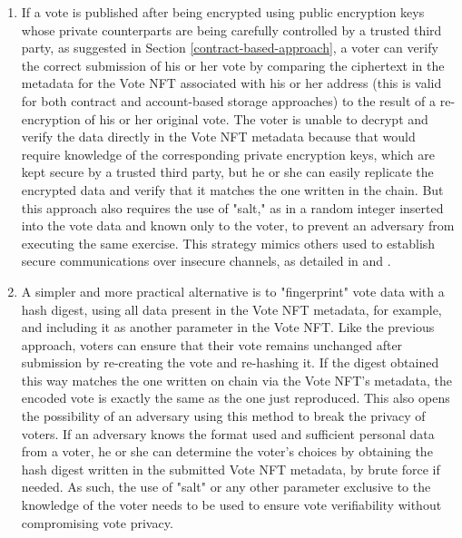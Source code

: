 \documentclass[../main.tex]{subfiles}
\begin{document}
            \begin{enumerate}
                \item{If a vote is published after being encrypted using public encryption keys whose private counterparts are being carefully controlled by a trusted third party, as suggested in Section \ref{contract-based-approach}, a voter can verify the correct submission of his or her vote by comparing the ciphertext in the metadata for the Vote NFT associated with his or her address (this is valid for both contract and account-based storage approaches) to the result of a re-encryption of his or her original vote. The voter is unable to decrypt and verify the data directly in the Vote NFT metadata because that would require knowledge of the corresponding private encryption keys, which are kept secure by a trusted third party, but he or she can easily replicate the encrypted data and verify that it matches the one written in the chain. But this approach also requires the use of "salt," as in a random integer inserted into the vote data and known only to the voter, to prevent an adversary from executing the same exercise. This strategy mimics others used to establish secure communications over insecure channels, as detailed in \cite{Merkle1978} and \cite{Merkle1980}.}
                \item{A simpler and more practical alternative is to "fingerprint" vote data with a hash digest, using all data present in the Vote NFT metadata, for example, and including it as another parameter in the Vote NFT. Like the previous approach, voters can ensure that their vote remains unchanged after submission by re-creating the vote and re-hashing it. If the digest obtained this way matches the one written on chain via the Vote NFT's metadata, the encoded vote is exactly the same as the one just reproduced. This also opens the possibility of an adversary using this method to break the privacy of voters. If an adversary knows the format used and sufficient personal data from a voter, he or she can determine the voter's choices by obtaining the hash digest written in the submitted Vote NFT metadata, by brute force if needed. As such, the use of "salt" or any other parameter exclusive to the knowledge of the voter needs to be used to ensure vote verifiability without compromising vote privacy.}
            \end{enumerate}
\end{document}
